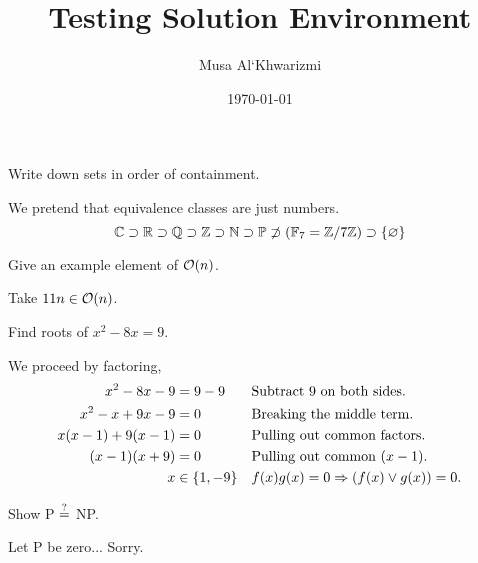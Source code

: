 \documentclass{homework}
\author{Musa Al`Khwarizmi}
\date{\today}
\title{Testing Solution Environment}
\begin{document}
 \maketitle
\question Write down sets in order of containment.

\begin{sol}
  We pretend that equivalence classes are just numbers.
  \[
    \C \supset \R \supset \Q \supset \Z \supset \N \supset
    \P \not\supset (\GF[7] = \modulo[7])  \supset \{\nil\}
  \]
\end{sol}

\question Give an example element of $\O(n)$.

\begin{sol}[blue]
  Take $11n \in \O(n)$.
\end{sol}
\question Find roots of $x^2- 8x = 9$.

\begin{sol}
  We proceed by factoring,
  \begin{align*}
    x^2- 8x - 9         & = 9-9         &  & \text{Subtract 9 on both sides.}         \\
    x^2- x + 9x - 9     & = 0           &  & \text{Breaking the middle term.}         \\
    x(x - 1) + 9(x - 1) & = 0           &  & \text{Pulling out common factors.}       \\
    (x - 1)(x + 9)      & = 0           &  & \text{Pulling out common } (x - 1).      \\
    x                   & \in \{1, -9\} &  & f(x)g(x) = 0 \Ra (f(x) \vee g(x)) = 0.
  \end{align*}
\end{sol}

\question Show P $\?$ NP.

\begin{sol}
  Let P be zero... Sorry.
\end{sol}
\end{document}
